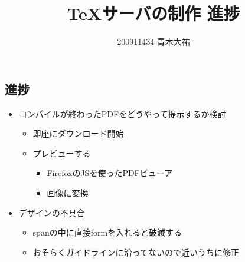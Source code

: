 \documentclass[a4paper,8pt,min]{jsarticle}
\title{TeXサーバの制作 進捗}
\author{200911434 青木大祐}
\begin{document}
\maketitle

\subsection*{進捗}
\begin{itemize}
 \item コンパイルが終わったPDFをどうやって提示するか検討
 \begin{itemize}
  \item 即座にダウンロード開始
  \item プレビューする
        \begin{itemize}
         \item FirefoxのJSを使ったPDFビューア
         \item 画像に変換
        \end{itemize}
 \end{itemize}
\vspace{1zh}
 \item デザインの不具合
       \begin{itemize}
        \item spanの中に直接formを入れると破滅する
        \item おそらくガイドラインに沿ってないので近いうちに修正
       \end{itemize}

\end{itemize}
\end{document}

